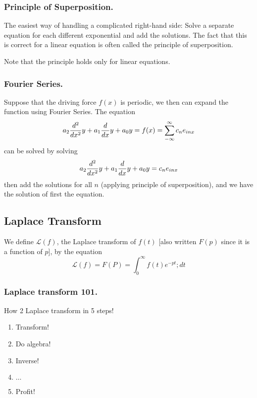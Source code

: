 \documentclass[../main.tex]{subfiles}
\begin{document}
\subsubsection*{Principle of Superposition.} The easiest way of handling a complicated right-hand side: Solve a separate equation for each different exponential and add the solutions.
The fact that this is correct for a linear equation is often called the principle of superposition.

Note that the principle holds only for linear equations.

\subsubsection*{Fourier Series.}
Suppose that the driving force $f(x)$ is periodic, we then can expand the function using Fourier Series.
The equation
\begin{equation*}
    a_2\frac{d^2}{dx^2} y+a_1\frac{d}{dx} y+a_0y=f(x)=\sum_{-\infty}^{\infty}c_ne_{inx}
\end{equation*}
can be solved by solving
\begin{equation*}
    a_2\frac{d^2}{dx^2} y+a_1\frac{d}{dx} y+a_0y=c_ne_{inx}
\end{equation*}
then add the solutions for all $n$ (applying principle of superposition), and we have the solution of first the equation.

\subsection*{Laplace Transform}
We define $\mathcal{L}(f )$, the Laplace transform of $f (t)$ [also written $F (p)$ since it is a function of $p$], by the equation
\begin{equation*}
    \mathcal{L}(f)=F(P)=\int_{0}^{\infty}f(t)e^{-pt};dt
\end{equation*}

\subsubsection*{Laplace transform 101.} How 2 Laplace transform in 5 steps!
\begin{enumerate}
    \item Transform!
    \item Do algebra!
    \item Inverse!
    \item $\dots$
    \item Profit!
\end{enumerate}
\end{document}
